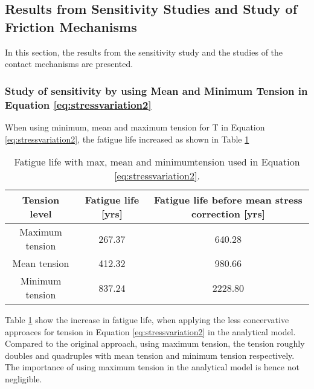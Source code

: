 \subsection{Results from Sensitivity Studies and Study of Friction Mechanisms}
In this section, the results from the sensitivity study and the studies of the contact mechanisms are presented. 
\subsubsection{Study of sensitivity by using Mean and Minimum Tension in Equation \ref{eq:stressvariation2}}
When using minimum, mean and maximum tension for T in Equation \ref{eq:stressvariation2}, the fatigue life increased as shown in Table \ref{table:maxmin}

\begin{table} [H]
\centering
\begin{tabular}{ |c|c|c|}
\hline
Tension level & Fatigue life [yrs] & Fatigue life before mean stress correction [yrs]\\ 
 \hline
 \hline
    Maximum tension & 267.37 & 640.28 \\ 
    Mean tension & 412.32 & 980.66 \\ 
    Minimum tension & 837.24 & 2228.80 \\ 
    \hline
\end{tabular}
\caption{Fatigue life with max, mean and minimumtension used in Equation \ref{eq:stressvariation2}.}
\label{table:maxmin}
\end{table} 
Table \ref{table:maxmin} show the increase in fatigue life, when applying the less concervative approaces for tension in Equation \ref{eq:stressvariation2} in the analytical model. Compared to the original approach, using maximum tension, the tension roughly doubles and quadruples with mean tension and minimum tension respectively. The importance of using maximum tension in the analytical model is hence not negligible. 
 
